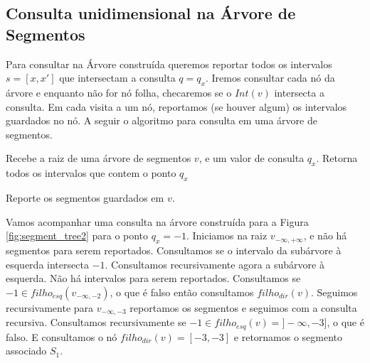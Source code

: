 \subsection{Consulta unidimensional na Árvore de Segmentos}
Para consultar na Árvore construída queremos reportar todos os intervalos $s= [x, x']$ que intersectam a consulta $q = q_x$. Iremos consultar cada nó da árvore e enquanto não for nó folha, checaremos se o $Int(v)$ intersecta a consulta. Em cada visita a um nó, reportamos (se houver algum) os intervalos guardados no nó. A seguir o algoritmo para consulta em uma árvore de segmentos.

\begin{algorithm}[h!]
    \caption{Recebe a raiz de uma árvore de segmentos $v$, e um valor de consulta $q_x$. Retorna todos os intervalos que contem o ponto $q_x$}
    \begin{algorithmic}[1]
            \State Reporte os segmentos guardados em $v$.
                    \State {}
                \Else
                    \State {}
                \EndIf
            \EndIf
        \EndFunction
    \end{algorithmic}
\end{algorithm}

Vamos acompanhar uma consulta na árvore construída para a Figura \ref{fig:segment_tree2} para o ponto $q_x=-1$. Iniciamos na raiz $v_{-\infty, + \infty}$, e não há segmentos para serem reportados. Consultamos se o intervalo da subárvore à esquerda intersecta $-1$. Consultamos recursivamente agora a subárvore à esquerda. Não há intervalos para serem reportados. Consultamos se $-1 \in filho_{esq}(v_{-\infty, -2})$, o que é falso então consultamos $filho_{dir}(v) $. Seguimos recursivamente para $v_{-\infty, -3}$ reportamos os segmentos e seguimos com a consulta recursiva. Consultamos recursivamente se $-1 \in filho_{esq}(v) = ]-\infty, -3]$, o que é falso. E consultamos o nó $filho_{dir}(v) = [-3, -3]$ e retornamos o segmento associado $S_1$.

